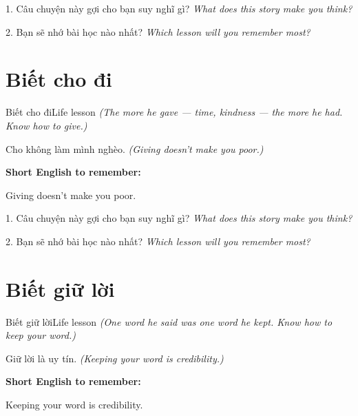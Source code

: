 \begin{tuhocnhanh}
1. Câu chuyện này gợi cho bạn suy nghĩ gì? \textit{What does this story make you think?}

2. Bạn sẽ nhớ bài học nào nhất? \textit{Which lesson will you remember most?}
\end{tuhocnhanh}
\ngancach


\section{Biết cho đi}
\begin{truyen}{Biết cho đi}{Life lesson}
\textit{(The more he gave — time, kindness — the more he had. Know how to give.)}
\end{truyen}

\begin{baihoc}
Cho không làm mình nghèo.
\textit{(Giving doesn't make you poor.)}
\end{baihoc}

\begin{ghinhoanh}
\textbf{Short English to remember:}

Giving doesn't make you poor.

\end{ghinhoanh}

\begin{tuhocnhanh}
1. Câu chuyện này gợi cho bạn suy nghĩ gì? \textit{What does this story make you think?}

2. Bạn sẽ nhớ bài học nào nhất? \textit{Which lesson will you remember most?}
\end{tuhocnhanh}
\ngancach


\section{Biết giữ lời}
\begin{truyen}{Biết giữ lời}{Life lesson}
\textit{(One word he said was one word he kept. Know how to keep your word.)}
\end{truyen}

\begin{baihoc}
Giữ lời là uy tín.
\textit{(Keeping your word is credibility.)}
\end{baihoc}

\begin{ghinhoanh}
\textbf{Short English to remember:}

Keeping your word is credibility.

\end{ghinhoanh}

